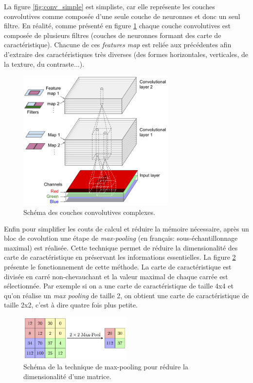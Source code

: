 La figure \ref{fig:conv_simple} est simpliste, car elle représente les couches convolutives comme composée d'une seule couche de neuronnes et donc un seul filtre. En réalité, comme présenté en figure \ref{fig:conv_complex} chaque couche convolutives est composée de plusieurs filtres (couches de neuronnes formant des carte de caractéristique). Chacune de ces \textit{features map} est reliée aux précédentes afin d'extraire des caractéristiques très diverses (des formes horizontales, verticales, de la texture, du contraste...).
\begin{figure}[!htbp]
 \centering
 \includegraphics[width=0.7\textwidth]{figures/conv_complex.png}
 \caption[Schéma des couches convolutives]{Schéma des couches convolutives complexes.}
 \label{fig:conv_complex}
\end{figure}
Enfin pour simplifier les couts de calcul et réduire la mémoire nécessaire, après un bloc de covolution une étape de \textit{max-pooling }(en français: sous-échantillonnage maximal) est réalisée. Cette technique permet de réduire la dimensionalité des carte de caractéristique en préservant les informations essentielles. La figure \ref{fig:max-pool} présente le fonctionnement de cette méthode. La carte de caractéristique est divisée en carré non-chevauchant et la valeur maximal de chaque carrée est sélectionnée. Par exemple si on a une carte de caractéristique de taille 4x4 et qu'on réalise un \textit{max pooling} de taille 2, on obtient une carte de caractéristique de taille 2x2, c'est à dire quatre fois plus petite.
\begin{figure}[!htbp]
 \centering
 \includegraphics[width=0.5\textwidth]{figures/max-pool.png}
 \caption[Technique de max-pooling]{Schéma de la technique de max-pooling pour réduire la dimensionalité d'une matrice.}
 \label{fig:max-pool}
\end{figure}

